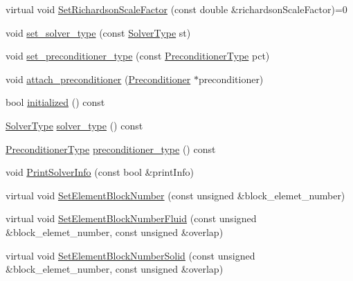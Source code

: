\begin{DoxyCompactItemize}
\item 
virtual void \mbox{\hyperlink{classfemus_1_1_linear_equation_solver_a89e130ac674f653d568900238c9f1395}{Set\+Richardson\+Scale\+Factor}} (const double \&richardson\+Scale\+Factor)=0
\item 
void \mbox{\hyperlink{classfemus_1_1_linear_equation_solver_a8806dab2868fc1b793cb6607920bcd09}{set\+\_\+solver\+\_\+type}} (const \mbox{\hyperlink{_solvertype_enum_8hpp_a8b06041d7c1fb05f379714f4312306ec}{Solver\+Type}} st)
\item 
void \mbox{\hyperlink{classfemus_1_1_linear_equation_solver_a43f59d053804f858ca075c8f5e39834c}{set\+\_\+preconditioner\+\_\+type}} (const \mbox{\hyperlink{_precondtype_enum_8hpp_a8b341faac6531c4543c9dc6e5e4592cf}{Preconditioner\+Type}} pct)
\item 
void \mbox{\hyperlink{classfemus_1_1_linear_equation_solver_a6beb9feba179b5443d4cdd05e2fd46f4}{attach\+\_\+preconditioner}} (\mbox{\hyperlink{classfemus_1_1_preconditioner}{Preconditioner}} $\ast$preconditioner)
\item 
bool \mbox{\hyperlink{classfemus_1_1_linear_equation_solver_a76babcafc38f42ee0137d571fb994637}{initialized}} () const
\item 
\mbox{\hyperlink{_solvertype_enum_8hpp_a8b06041d7c1fb05f379714f4312306ec}{Solver\+Type}} \mbox{\hyperlink{classfemus_1_1_linear_equation_solver_a324c2db823c76cbafd00a94e04c99aad}{solver\+\_\+type}} () const
\item 
\mbox{\hyperlink{_precondtype_enum_8hpp_a8b341faac6531c4543c9dc6e5e4592cf}{Preconditioner\+Type}} \mbox{\hyperlink{classfemus_1_1_linear_equation_solver_a23b3ae3499f28474a3e97495ef711d65}{preconditioner\+\_\+type}} () const
\item 
void \mbox{\hyperlink{classfemus_1_1_linear_equation_solver_ae53651484ffebc06e7a95e5a5b0d82d7}{Print\+Solver\+Info}} (const bool \&print\+Info)
\item 
virtual void \mbox{\hyperlink{classfemus_1_1_linear_equation_solver_af467f11da786efe6d12b230a58b54eb7}{Set\+Element\+Block\+Number}} (const unsigned \&block\+\_\+elemet\+\_\+number)
\item 
virtual void \mbox{\hyperlink{classfemus_1_1_linear_equation_solver_a66952f3530ccf677bac20da7ef3b15e0}{Set\+Element\+Block\+Number\+Fluid}} (const unsigned \&block\+\_\+elemet\+\_\+number, const unsigned \&overlap)
\item 
virtual void \mbox{\hyperlink{classfemus_1_1_linear_equation_solver_aad722059ff7cecc7de89a470c831351f}{Set\+Element\+Block\+Number\+Solid}} (const unsigned \&block\+\_\+elemet\+\_\+number, const unsigned \&overlap)

\end{DoxyCompactItemize}
